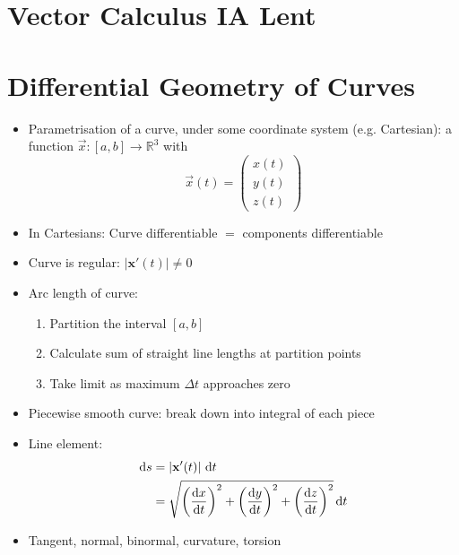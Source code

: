 


\section*{Vector Calculus \hfill IA Lent}
\section{Differential Geometry of Curves}
\begin{itemize}
      \item Parametrisation of a curve, under some coordinate system (e.g. Cartesian):
            a function \( \vec{x}:[a,b] \to \mathbb{R}^3\) with
            \[\vec{x}(t) = \begin{pmatrix} x(t) \\  y(t) \\ z(t) \end{pmatrix} \]
      \item In Cartesians: Curve differentiable $=$ components differentiable
      \item Curve is regular: $|\mathbf{x'}(t)| \neq 0$
      \item Arc length of curve:
            \begin{enumerate}
                  \item Partition the interval \([a,b]\)
                  \item Calculate sum of straight line lengths at partition points
                  \item Take limit as maximum $\Delta t$ approaches zero
            \end{enumerate}
      \item Piecewise smooth curve: break down into integral of each piece
      \item Line element:
            \begin{align*}
                  \mathrm{d} s & = \left| \boldsymbol{\mathbf{x}}'(t) \right| \, \mathrm{d} t                                                                              \\
                        & = \sqrt{ \left( \frac{\mathrm{d}{x}}{\mathrm{d}{t}} \right)^2 +\left( \frac{\mathrm{d}{y}}{\mathrm{d}{t}} \right)^2 + \left( \frac{\mathrm{d}{z}}{\mathrm{d}{t}} \right)^2} \, \mathrm{d} t
            \end{align*}

      \item Tangent, normal, binormal, curvature, torsion
\end{itemize}



